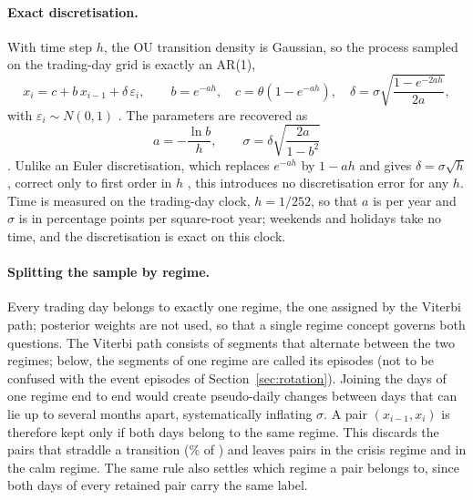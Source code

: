 \documentclass[11pt,a4paper]{article}
\begin{document}
\paragraph{Exact discretisation.} With time step $h$, the OU transition density is Gaussian, so the process sampled on the trading-day grid is exactly an AR(1),
\begin{equation}
x_i=c+b\,x_{i-1}+\delta\,\varepsilon_i,\qquad b=e^{-ah},\quad c=\theta\left(1-e^{-ah}\right),\quad \delta=\sigma\sqrt{\frac{1-e^{-2ah}}{2a}},
\end{equation}
with $\varepsilon_i\sim N(0,1)$ \citep[eqs.~49--52]{brigo2008}. The parameters are recovered as
\begin{equation}
a=-\frac{\ln b}{h},\qquad \sigma=\delta\sqrt{\frac{2a}{1-b^2}}
\end{equation}
\citep[eq.~55; eq.~57 rewritten with $\ln b=-ah$]{brigo2008}. Unlike an Euler discretisation, which replaces $e^{-ah}$ by $1-ah$ and gives $\delta=\sigma\sqrt{h}$, correct only to first order in $h$ \citep[p.~29]{brigo2008}, this introduces no discretisation error for any $h$. Time is measured on the trading-day clock, $h=1/252$, so that $a$ is per year and $\sigma$ is in percentage points per square-root year; weekends and holidays take no time, and the discretisation is exact on this clock.

\paragraph{Splitting the sample by regime.} Every trading day belongs to exactly one regime, the one assigned by the Viterbi path; posterior weights are not used, so that a single regime concept governs both questions. The Viterbi path consists of \NSeg{} segments that alternate between the two regimes; below, the segments of one regime are called its episodes (not to be confused with the event episodes of Section~\ref{sec:rotation}). Joining the days of one regime end to end would create pseudo-daily changes between days that can lie up to several months apart, systematically inflating $\sigma$. A pair $(x_{i-1},x_i)$ is therefore kept only if both days belong to the same regime. This discards the \NSeams{} pairs that straddle a transition (\SeamShare\% of \NPairsAll) and leaves \nK{} pairs in the crisis regime and \nR{} in the calm regime. The same rule also settles which regime a pair belongs to, since both days of every retained pair carry the same label.
\end{document}
